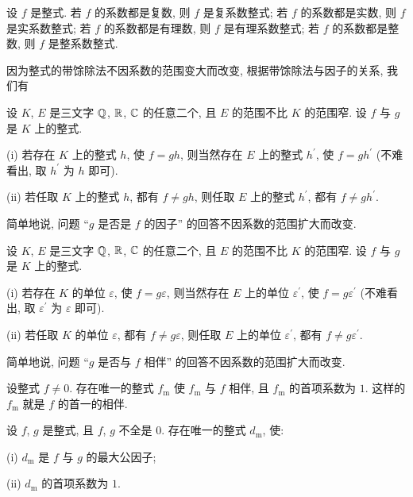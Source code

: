 \begin{definition}
    设 $f$ 是整式. 若 $f$ 的系数都是复数, 则 $f$ 是复系数整式; 若 $f$ 的系数都是实数, 则 $f$ 是实系数整式; 若 $f$ 的系数都是有理数, 则 $f$ 是有理系数整式; 若 $f$ 的系数都是整数, 则 $f$ 是整系数整式.
\end{definition}

因为整式的带馀除法不因系数的范围变大而改变, 根据带馀除法与因子的关系, 我们有
\begin{proposition}
    设 $K$, $E$ 是三文字 $\mathbb{Q}$, $\mathbb{R}$, $\mathbb{C}$ 的任意二个, 且 $E$ 的范围不比 $K$ 的范围窄. 设 $f$ 与 $g$ 是 $K$ 上的整式.

    (i) 若存在 $K$ 上的整式 $h$, 使 $f = gh$, 则当然存在 $E$ 上的整式 $h^{\prime}$, 使 $f = gh^{\prime}$ (不难看出, 取 $h^{\prime}$ 为 $h$ 即可).

    (ii) 若任取 $K$ 上的整式 $h$, 都有 $f \neq gh$, 则任取 $E$ 上的整式 $h^{\prime}$, 都有 $f \neq gh^{\prime}$.

    简单地说, 问题 ``$g$ 是否是 $f$ 的因子'' 的回答不因系数的范围扩大而改变.
\end{proposition}

\begin{proposition}
    设 $K$, $E$ 是三文字 $\mathbb{Q}$, $\mathbb{R}$, $\mathbb{C}$ 的任意二个, 且 $E$ 的范围不比 $K$ 的范围窄. 设 $f$ 与 $g$ 是 $K$ 上的整式.

    (i) 若存在 $K$ 的单位 $\varepsilon$, 使 $f = g\varepsilon$, 则当然存在 $E$ 上的单位 $\varepsilon^{\prime}$, 使 $f = g\varepsilon^{\prime}$ (不难看出, 取 $\varepsilon^{\prime}$ 为 $\varepsilon$ 即可).

    (ii) 若任取 $K$ 的单位 $\varepsilon$, 都有 $f \neq g\varepsilon$, 则任取 $E$ 上的单位 $\varepsilon^{\prime}$, 都有 $f \neq g\varepsilon^{\prime}$.

    简单地说, 问题 ``$g$ 是否与 $f$ 相伴'' 的回答不因系数的范围扩大而改变.
\end{proposition}

\begin{proposition}
    设整式 $f \neq 0$. 存在唯一的整式 $f_\mathrm{m}$ 使 $f_\mathrm{m}$ 与 $f$ 相伴, 且 $f_\mathrm{m}$ 的首项系数为 $1$. 这样的 $f_\mathrm{m}$ 就是 $f$ 的首一的相伴.
\end{proposition}

\begin{proposition}
    设 $f$, $g$ 是整式, 且 $f$, $g$ 不全是 $0$. 存在唯一的整式 $d_\mathrm{m}$, 使:

    (i) $d_\mathrm{m}$ 是 $f$ 与 $g$ 的最大公因子;

    (ii) $d_\mathrm{m}$ 的首项系数为 $1$.
\end{proposition}

